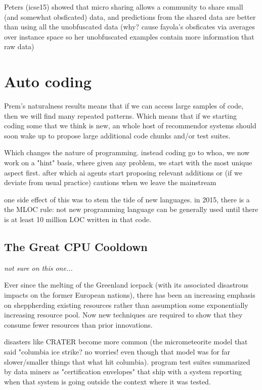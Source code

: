 \documentclass[journal]{IEEEtran}
\begin{document}
Peters (icse15) showed that micro sharing allows a community to share small (and somewhat obsficated) data, and predictions from the shared data are better than using all the unobfuscated data (why? cause fayola's obsficates via   averages over instance space so her 
unobfuscated examples contain more information that raw data)

\section{Auto coding}

Prem's naturalness results means that if we can access large samples of code,
then we will find many repeated patterns. Which means that if we starting coding some that we think is new, an whole host of recommendor  systems should soon   wake up to propose large additional code chunks and/or test suites. 

Which changes the nature of programming. instead coding go to whoa, we now work on a "hint" basis, where given any problem, we start with the most unique aspect first. after which ai agents start proposing relevant additions or (if we deviate from usual practice) cautions when we leave the mainstream

one side effect of this was to stem the tide of new languages. in 2015, there is a the MLOC rule: not new programming language can be generally used until there is at least 10 million LOC written in that code.  

\subsection{The Great CPU Cooldown}

{\em not sure on this one...}

Ever since the melting of the Greenland icepack (with its associated disastrous impacts on the former European nations), there has been an increasing emphasis on sheppherding existing resources rather than assumption some exponentially increasing resource pool. Now new techniques are required to show that they consume fewer resources than prior innovations. 



disasters like CRATER become more common (the micrometeorite model that said "columbia ice strike? no worries! even though that model was for far slower/smaller things that what hit columbia). program test suites summarized by data miners as "certification envelopes" that ship with a system reporting when that system is going outside the context where it was tested.
\end{document}
